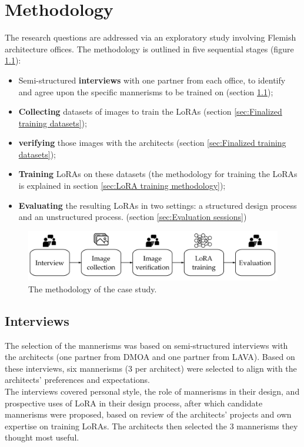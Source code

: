 \chapter{Methodology}

The research questions are addressed via an exploratory study involving Flemish architecture offices. The methodology is outlined in five sequential stages (figure \ref{fig:methodologycasestudy}):


\begin{itemize}
    \item Semi-structured \textbf{interviews} with one partner from each office, to identify and agree upon the specific mannerisms to be trained on (section \ref{sec:Interviews});
    \item \textbf{Collecting} datasets of images to train the LoRAs (section \ref{sec:Finalized training datasets});
    \item \textbf{verifying} those images with the architects (section \ref{sec:Finalized training datasets});
    \item \textbf{Training} LoRAs on these datasets (the methodology for training the LoRAs is explained in section \ref{sec:LoRA training methodology});
    \item \textbf{Evaluating} the resulting LoRAs in two settings: a structured design process and an unstructured process. (section \ref{sec:Evaluation sessions})
\end{itemize}
\begin{figure}[H]
    \centering
    \includegraphics[width=\linewidth]{Images/Methodology/Methodology.jpg}
    \caption{The methodology of the case study.}
    \label{fig:methodologycasestudy}
\end{figure}

\section{Interviews} \label{sec:Interviews}

The selection of the mannerisms was based on semi-structured interviews with the architects (one partner from DMOA and one partner from LAVA). Based on these interviews, six mannerisms (3 per architect) were selected to align with the architects' preferences and expectations.\\ The interviews covered personal style, the role of mannerisms in their design, and prospective uses of LoRA in their design process, after which candidate mannerisms were proposed, based on review of the architects' projects and own expertise on training LoRAs. The architects then selected the 3 mannerisms they thought most useful.

